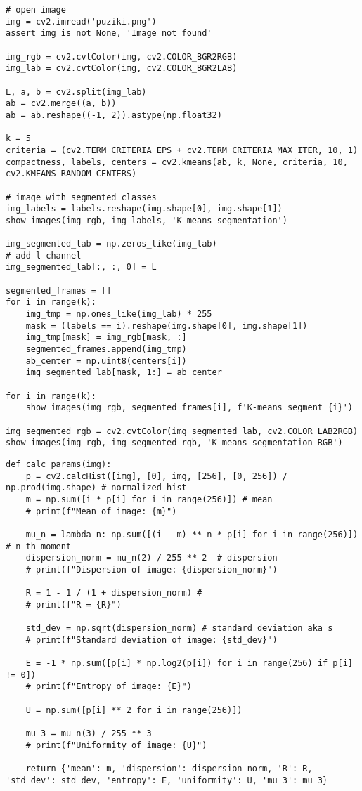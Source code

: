 \begin{lstlisting}[caption={Исзоходный код для сегментации k-means}, label={lst:k_means}]
# open image
img = cv2.imread('puziki.png')
assert img is not None, 'Image not found'

img_rgb = cv2.cvtColor(img, cv2.COLOR_BGR2RGB)
img_lab = cv2.cvtColor(img, cv2.COLOR_BGR2LAB)

L, a, b = cv2.split(img_lab)
ab = cv2.merge((a, b))
ab = ab.reshape((-1, 2)).astype(np.float32)

k = 5
criteria = (cv2.TERM_CRITERIA_EPS + cv2.TERM_CRITERIA_MAX_ITER, 10, 1)
compactness, labels, centers = cv2.kmeans(ab, k, None, criteria, 10, cv2.KMEANS_RANDOM_CENTERS)

# image with segmented classes 
img_labels = labels.reshape(img.shape[0], img.shape[1])
show_images(img_rgb, img_labels, 'K-means segmentation')

img_segmented_lab = np.zeros_like(img_lab)
# add l channel
img_segmented_lab[:, :, 0] = L

segmented_frames = []
for i in range(k):
    img_tmp = np.ones_like(img_lab) * 255
    mask = (labels == i).reshape(img.shape[0], img.shape[1])
    img_tmp[mask] = img_rgb[mask, :]
    segmented_frames.append(img_tmp)
    ab_center = np.uint8(centers[i])
    img_segmented_lab[mask, 1:] = ab_center

for i in range(k):
    show_images(img_rgb, segmented_frames[i], f'K-means segment {i}')

img_segmented_rgb = cv2.cvtColor(img_segmented_lab, cv2.COLOR_LAB2RGB)
show_images(img_rgb, img_segmented_rgb, 'K-means segmentation RGB')
\end{lstlisting}

\begin{lstlisting}[caption={Исзодный код функции для вычсиления парметров текструы обласьт}]
def calc_params(img):
    p = cv2.calcHist([img], [0], img, [256], [0, 256]) / np.prod(img.shape) # normalized hist
    m = np.sum([i * p[i] for i in range(256)]) # mean
    # print(f"Mean of image: {m}")

    mu_n = lambda n: np.sum([(i - m) ** n * p[i] for i in range(256)]) # n-th moment
    dispersion_norm = mu_n(2) / 255 ** 2  # dispersion
    # print(f"Dispersion of image: {dispersion_norm}")

    R = 1 - 1 / (1 + dispersion_norm) # 
    # print(f"R = {R}")

    std_dev = np.sqrt(dispersion_norm) # standard deviation aka s 
    # print(f"Standard deviation of image: {std_dev}")

    E = -1 * np.sum([p[i] * np.log2(p[i]) for i in range(256) if p[i] != 0])
    # print(f"Entropy of image: {E}")

    U = np.sum([p[i] ** 2 for i in range(256)])

    mu_3 = mu_n(3) / 255 ** 3
    # print(f"Uniformity of image: {U}")

    return {'mean': m, 'dispersion': dispersion_norm, 'R': R, 'std_dev': std_dev, 'entropy': E, 'uniformity': U, 'mu_3': mu_3}

\end{lstlisting}

